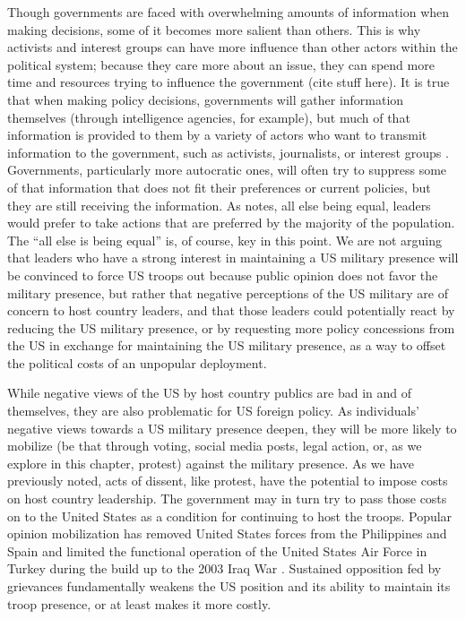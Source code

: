 {	%
	
	Though governments are faced with overwhelming amounts of information when making decisions, some of it becomes more salient than others. This is why activists and interest groups can have more influence than other actors within the political system; because they care more about an issue, they can spend more time and resources trying to influence the government (cite stuff here). It is true that when making policy decisions, governments will gather information themselves (through intelligence agencies, for example), but much of that information is provided to them by a variety of actors who want to transmit information to the government, such as activists, journalists, or interest groups \cite[p.15]{Baumgartner2015}. Governments, particularly more autocratic ones, will often try to suppress some of that information that does not fit their preferences or current policies, but they are still receiving the information. As  notes, all else being equal, leaders would prefer to take actions that are preferred by the majority of the population. The ``all else is being equal'' is, of course, key in this point. We are not arguing that leaders who have a strong interest in maintaining a US military presence will be convinced to force US troops out because public opinion does not favor the military presence, but rather that negative perceptions of the US military are of concern to host country leaders, and that those leaders could potentially react by reducing the US military presence, or by requesting more policy concessions from the US in exchange for maintaining the US military presence, as a way to offset the political costs of an unpopular deployment. 
	
While negative views of the US by host country publics are bad in and of themselves, they are also problematic for US foreign policy. As individuals' negative views towards a US military presence deepen, they will be more likely to mobilize (be that through voting, social media posts, legal action, or, as we explore in this chapter, protest) against the military presence. As we have previously noted, acts of dissent, like protest, have the potential to impose costs on host country leadership. The government may in turn try to pass those costs on to the United States as a condition for continuing to host the troops. Popular opinion mobilization has removed United States forces from the Philippines and Spain and limited the functional operation of the United States Air Force in Turkey during the build up to the 2003 Iraq War \cite{cooley2008,Kakizaki2011}. Sustained opposition fed by grievances fundamentally weakens the US position and its ability to maintain its troop presence, or at least makes it more costly.
		
}
